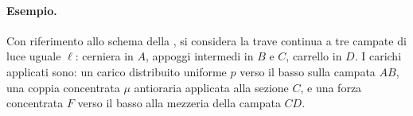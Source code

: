 \paragraph{Esempio.}
\label{par:esempio_trave_continua}

Con riferimento allo schema della ,
si considera la trave continua a tre campate di luce uguale
$\ell$: cerniera in $A$, appoggi intermedi in $B$ e $C$,
carrello in $D$. I carichi applicati sono: un carico distribuito
uniforme $p$ verso il basso sulla campata $AB$,  una coppia concentrata $\mu$ antioraria
applicata alla sezione  $C$, e una forza concentrata $F$ verso il basso alla mezzeria
della campata $CD$.

